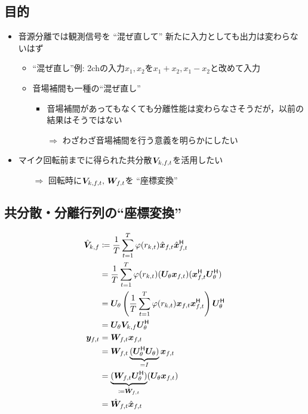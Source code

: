 \documentclass[twocolumn,9pt,dvipdfmx]{article}
\begin{document}
\subsection*{目的}
\begin{itemize}
  \item 音源分離では観測信号を ``混ぜ直して'' 新たに入力としても出力は変わらないはず
    \begin{itemize}
      \item ``混ぜ直し''例: 2chの入力$x_1, x_2$を$x_1+x_2, x_1-x_2$と改めて入力
      \item 音場補間も一種の``混ぜ直し''
        \begin{itemize}
          \item 音場補間があってもなくても分離性能は変わらなさそうだが，以前の結果はそうではない
          \item[$\Rightarrow$] わざわざ音場補間を行う意義を明らかにしたい
        \end{itemize}
    \end{itemize}
  \item マイク回転前までに得られた共分散$\cov _{\src,\ft}$を活用したい
    \begin{itemize}
      \item[$\Rightarrow$] 回転時に$\cov _{\src,\ft},\, \Demix _{\ft}$を ``座標変換''
    \end{itemize}
\end{itemize}

\subsection*{共分散・分離行列の``座標変換''}
\begin{align}
  \rot{\cov} _{\src,\freq} &\coloneqq \frac{1}{\Tframe} \sum _{\tframe = 1} ^{\Tframe} \weight (\var _{\src,\tframe}) \rotObs _{\ft} \rotObs _{\ft} ^{\hermite} \\
                           &= \frac{1}{\Tframe} \sum _{\tframe = 1} ^{\Tframe} \weight (\var _{\src,\tframe}) (\rotMat _{\rotDeg} \Obs _{\ft}) (\Obs _{\ft} ^{\hermite} \rotMat _{\rotDeg} ^{\hermite}) \\
                           &= \rotMat _{\rotDeg} \left(\frac{1}{\Tframe} \sum _{\tframe = 1} ^{\Tframe} \weight (\var _{\src,\tframe}) \Obs _{\ft} \Obs _{\ft} ^{\hermite}\right) \rotMat _{\rotDeg} ^{\hermite} \\
                           &= \rotMat _{\rotDeg} \cov _{\src,\freq} \rotMat _{\rotDeg} ^{\hermite}
  \\
  \Est _{\ft} &= \Demix _{\ft} \Obs _{\ft} \\
              &= \Demix _{\ft} \underbrace{(\rotMat _{\rotDeg} ^{\hermite} \rotMat _{\rotDeg})}_{=I} \Obs _{\ft} \\
              &= \underbrace{(\Demix _{\ft} \rotMat _{\rotDeg} ^{\hermite})}_{\coloneqq \rotDemix _{\ft}} (\rotMat _{\rotDeg} \Obs _{\ft}) \\
              &= \rotDemix _{\ft} \rotObs _{\ft}
\end{align}
\end{document}
